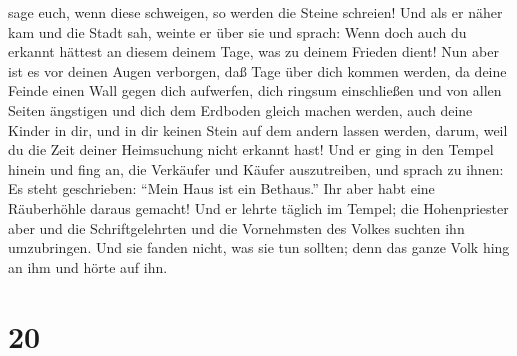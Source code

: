 sage euch, wenn diese schweigen, so werden die Steine schreien!
 Und als er näher kam und die Stadt sah, weinte er über
sie  und sprach: Wenn doch auch du erkannt hättest an
diesem deinem Tage, was zu deinem Frieden dient!  Nun
aber ist es vor deinen Augen verborgen, daß Tage über dich kommen
werden, da deine Feinde einen Wall gegen dich aufwerfen, dich ringsum
einschließen und von allen Seiten ängstigen  und dich dem
Erdboden gleich machen werden, auch deine Kinder in dir, und in dir
keinen Stein auf dem andern lassen werden, darum, weil du die Zeit
deiner Heimsuchung nicht erkannt hast!  Und er ging in
den Tempel hinein und fing an, die Verkäufer und Käufer auszutreiben,
und sprach zu ihnen:  Es steht geschrieben: ``Mein Haus
ist ein Bethaus.'' Ihr aber habt eine Räuberhöhle daraus gemacht!
 Und er lehrte täglich im Tempel; die Hohenpriester aber
und die Schriftgelehrten und die Vornehmsten des Volkes suchten ihn
umzubringen.  Und sie fanden nicht, was sie tun sollten;
denn das ganze Volk hing an ihm und hörte auf ihn.

\hypertarget{section-19}{%
\section{20}\label{section-19}}

